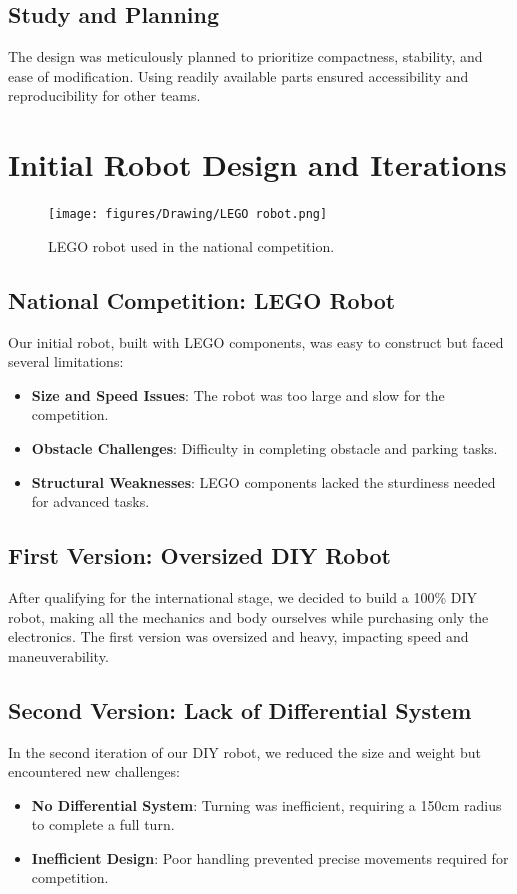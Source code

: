 \documentclass[12pt,a4paper]{article}
\begin{document}
\subsection{Study and Planning}
The design was meticulously planned to prioritize compactness, stability, and ease of modification. Using readily available parts ensured accessibility and reproducibility for other teams.
\newpage
\section{Initial Robot Design and Iterations}

\begin{figure}
    \centering
    \texttt{[image: figures/Drawing/LEGO robot.png]}
    \caption{LEGO robot used in the national competition.}

    
\end{figure}
\subsection{National Competition: LEGO Robot}
Our initial robot, built with LEGO components, was easy to construct but faced several limitations:
\begin{itemize}
    \item \textbf{Size and Speed Issues}: The robot was too large and slow for the competition.
    \item \textbf{Obstacle Challenges}: Difficulty in completing obstacle and parking tasks.
    \item \textbf{Structural Weaknesses}: LEGO components lacked the sturdiness needed for advanced tasks.
\end{itemize}



\subsection{First Version: Oversized DIY Robot}
After qualifying for the international stage, we decided to build a 100\% DIY robot, making all the mechanics and body ourselves while purchasing only the electronics. The first version was oversized and heavy, impacting speed and maneuverability.

\subsection{Second Version: Lack of Differential System}
In the second iteration of our DIY robot, we reduced the size and weight but encountered new challenges:
\begin{itemize}
    \item \textbf{No Differential System}: Turning was inefficient, requiring a 150cm radius to complete a full turn.
    \item \textbf{Inefficient Design}: Poor handling prevented precise movements required for competition.
\end{itemize}
\end{document}
